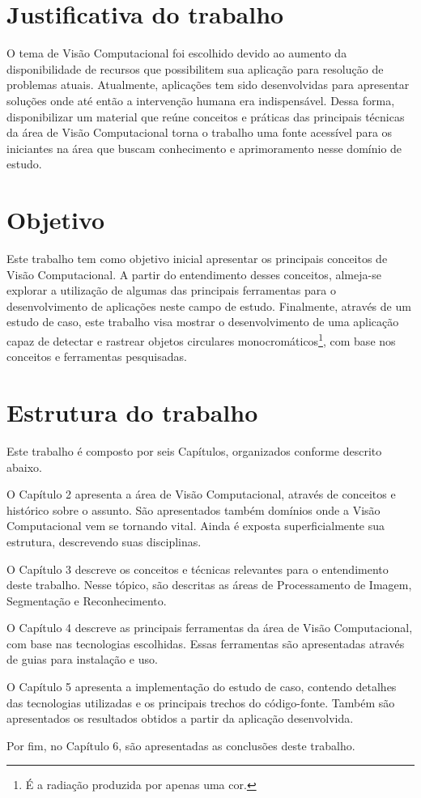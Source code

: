\section{Justificativa do trabalho}

O tema de Visão Computacional foi escolhido devido ao aumento da disponibilidade de recursos que possibilitem sua aplicação para resolução de problemas atuais. Atualmente, aplicações tem sido desenvolvidas para apresentar soluções onde até então a intervenção humana era indispensável. Dessa forma, disponibilizar um material que reúne conceitos e práticas das principais técnicas da área de Visão Computacional torna o trabalho uma fonte acessível para os iniciantes na área que buscam conhecimento e aprimoramento nesse domínio de estudo.

\section{Objetivo}

Este trabalho tem como objetivo inicial apresentar os principais conceitos de Visão Computacional. A partir do entendimento desses conceitos, almeja-se explorar a utilização de algumas das principais ferramentas para o desenvolvimento de aplicações neste campo de estudo. Finalmente, através de um estudo de caso, este trabalho visa mostrar o desenvolvimento de uma aplicação capaz de detectar e rastrear objetos circulares monocromáticos\footnote{É a radiação produzida por apenas uma cor.}, com base nos conceitos e ferramentas pesquisadas.

\section{Estrutura do trabalho}

Este trabalho é composto por seis Capítulos, organizados conforme descrito abaixo.

O Capítulo 2 apresenta a área de Visão Computacional, através de conceitos e histórico sobre o assunto. São apresentados também domínios onde a Visão Computacional vem se tornando vital. Ainda é exposta superficialmente sua estrutura, descrevendo suas disciplinas.

O Capítulo 3 descreve os conceitos e técnicas relevantes para o entendimento deste trabalho. Nesse tópico, são descritas as áreas de Processamento de Imagem, Segmentação e Reconhecimento.

O Capítulo 4 descreve as principais ferramentas da área de Visão Computacional, com base nas tecnologias escolhidas. Essas ferramentas são apresentadas através de guias para instalação e uso.

O Capítulo 5 apresenta a implementação do estudo de caso, contendo detalhes das tecnologias utilizadas e os principais trechos do código-fonte. Também são apresentados os resultados obtidos a partir da aplicação desenvolvida.

Por fim, no Capítulo 6, são apresentadas as conclusões deste trabalho.
